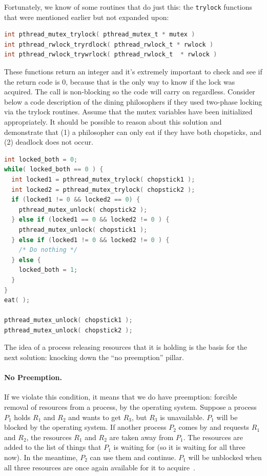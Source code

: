 \documentclass[a4paper]{report}
\begin{document}
Fortunately, we know of some routines that do just this: the \texttt{trylock} functions that were mentioned earlier but not expanded upon:
\begin{lstlisting}[language=C]
int pthread_mutex_trylock( pthread_mutex_t * mutex )
int pthread_rwlock_tryrdlock( pthread_rwlock_t * rwlock )
int pthread_rwlock_trywrlock( pthread_rwlock_t  * rwlock )
\end{lstlisting}

These functions return an integer and it's extremely important to check and see if the return code is 0, because that is the only way to know if the lock was acquired. The call is non-blocking so the code will carry on regardless. Consider below a code description of the dining philosophers if they used two-phase locking via the trylock routines. Assume that the mutex variables have been initialized appropriately. It should be possible to reason about this solution and demonstrate that (1) a philosopher can only eat if they have both chopsticks, and (2) deadlock does not occur.

\begin{lstlisting}[language=C]
int locked_both = 0;
while( locked_both == 0 ) {
  int locked1 = pthread_mutex_trylock( chopstick1 );
  int locked2 = pthread_mutex_trylock( chopstick2 );
  if (locked1 != 0 && locked2 == 0) {
    pthread_mutex_unlock( chopstick2 );
  } else if (locked1 == 0 && locked2 != 0 ) {
    pthread_mutex_unlock( chopstick1 );
  } else if (locked1 != 0 && locked2 != 0 ) {
    /* Do nothing */
  } else {
    locked_both = 1;
  }
}
eat( );

pthread_mutex_unlock( chopstick1 );
pthread_mutex_unlock( chopstick2 );
\end{lstlisting}

The idea of a process releasing resources that it is holding is the basis for the next solution: knocking down the ``no preemption'' pillar.


\paragraph{No Preemption.} If we violate this condition, it means that we do have preemption: forcible removal of resources from a process, by the operating system. Suppose a process $P_{1}$ holds $R_{1}$ and $R_{2}$ and wants to get $R_{3}$, but $R_{3}$ is unavailable. $P_{1}$ will be blocked by the operating system. If another process $P_{2}$ comes by and requests $R_{1}$ and $R_{2}$, the resources $R_{1}$ and $R_{2}$ are taken away from $P_{1}$. The resources are added to the list of things that $P_{1}$ is waiting for (so it is waiting for all three now). In the meantime, $P_{2}$ can use them and continue. $P_{1}$ will be unblocked when all three resources are once again available for it to acquire~\cite{osc}.
\end{document}

